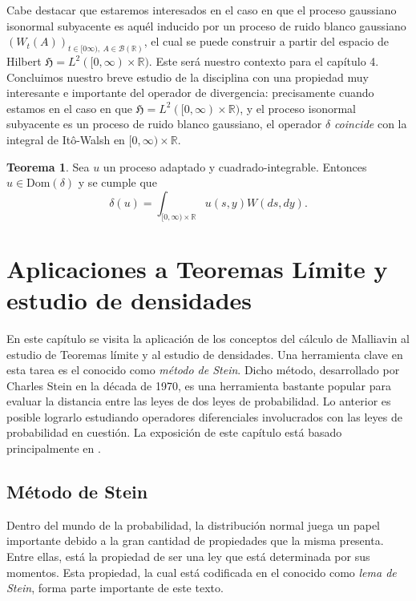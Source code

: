 \documentclass[letterpaper,twoside,12pt]{book}
\newcommand{\R}{\mathbb{R}}
\newcommand{\B}{\mathcal{B}}
\newcommand{\1}{\mathds{1}}
\theoremstyle{definition}
\theoremstyle{definition}
\newtheorem{teo}{Teorema}
\theoremstyle{remark}
\theoremstyle{definition}
\theoremstyle{definition}
\theoremstyle{definition}
\theoremstyle{definition}
\theoremstyle{definition}
\begin{document}
Cabe destacar que estaremos interesados en el caso en que el proceso gaussiano isonormal subyacente es aquél inducido por un proceso de ruido blanco gaussiano $(W_t(A))_{t\in [0\infty), \ A\in \B(\R)}$, el cual se puede construir a partir del espacio de Hilbert $\mathfrak{H}=L^{2}([0,\infty)\times \R)$. Este será nuestro contexto para el capítulo 4. Concluimos nuestro breve estudio de la disciplina con una propiedad muy interesante e importante del operador de divergencia: precisamente cuando estamos en el caso en que $\mathfrak{H}=L^2([0,\infty)\times\R)$, y el proceso isonormal subyacente es un proceso de ruido blanco gaussiano, el operador $\delta$ \textit{coincide} con la integral de Itô-Walsh en $[0,\infty)\times\R$.

\begin{teo} 
 Sea $u$ un proceso adaptado y cuadrado-integrable. Entonces $u\in \text{Dom}(\delta)$ y se cumple que 
 \[
 \delta(u)=\int_{[0,\infty)\times \R}^{}u(s,y)W(ds,dy).
 \]
 \end{teo}
 
 \chapter{Aplicaciones a Teoremas Límite y estudio de densidades}
En este capítulo se visita la aplicación de los conceptos del cálculo de Malliavin al estudio de Teoremas límite y al estudio de densidades. 
Una herramienta clave en esta tarea es el conocido como \textit{método de Stein}. 
Dicho método, desarrollado por Charles Stein en la década de 1970, es una herramienta bastante popular para evaluar la distancia entre las leyes de dos leyes de probabilidad. Lo anterior es posible lograrlo estudiando operadores diferenciales involucrados con las leyes de probabilidad en cuestión. La exposición de este capítulo está basado principalmente en \cite[capitulo 4]{Nourdin_Peccati_2012}. 

\section{Método de Stein}

Dentro del mundo de la probabilidad, la distribución normal juega un papel importante debido a la gran cantidad de propiedades que la misma presenta. Entre ellas, está la propiedad de ser una ley que está determinada por sus momentos. Esta propiedad, la cual está codificada en el conocido como \textit{lema de Stein}, forma parte importante de este texto. 
\end{document}
